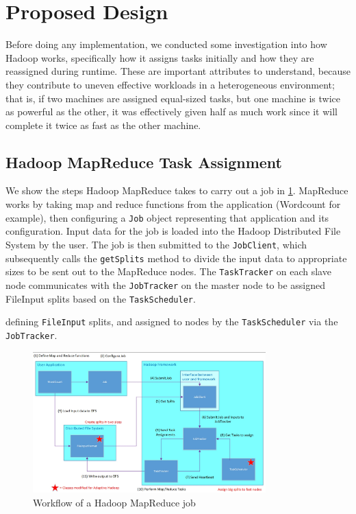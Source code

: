 \section{Proposed Design}
\label{section:propeseddesign}

Before doing any implementation, we conducted some investigation into how Hadoop works, 
specifically how it assigns tasks initially and how they are reassigned during runtime.
These are important attributes to understand, because they contribute to uneven effective
workloads in a heterogeneous environment; that is, if two machines are assigned equal-sized
tasks, but one machine is twice as powerful as the other, it was effectively given half as
much work since it will complete it twice as fast as the other machine.

\subsection{Hadoop MapReduce Task Assignment}

We show the steps Hadoop MapReduce takes to carry out a job in \ref{fig:flow}. MapReduce 
works by taking map and reduce functions from the application (Wordcount for example), 
then configuring a \texttt{Job} object representing that application and its configuration.
Input data for the job is loaded into the Hadoop Distributed File System by the user. 
The job is then submitted to the \texttt{JobClient}, which subsequently calls the 
\texttt{getSplits} method to divide the input data to appropriate sizes to be sent out to
the MapReduce nodes. The \texttt{TaskTracker} on each slave node communicates with
the \texttt{JobTracker} on the master node to be assigned FileInput splits based on the
\texttt{TaskScheduler}. 

defining \texttt{FileInput} splits, and
assigned to nodes by the \texttt{TaskScheduler} via the \texttt{JobTracker}. 

\begin{figure}[ht!]
\centering
\includegraphics[width=90mm]{flow.jpg}
\caption{Workflow of a Hadoop MapReduce job}
\label{fig:flow}
\end{figure}

